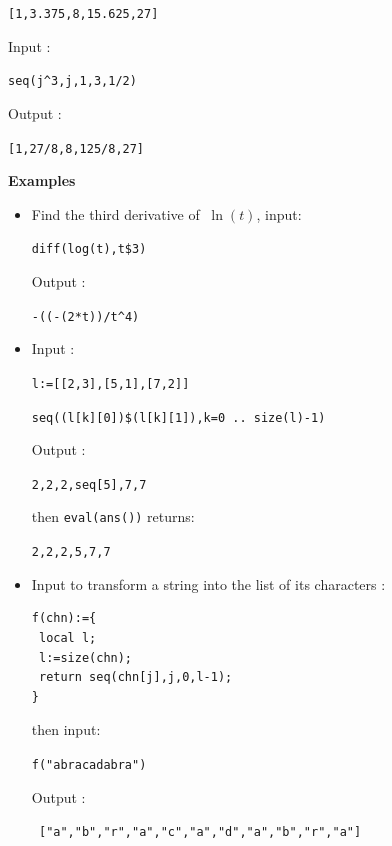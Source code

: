 \documentclass[a4paper,11pt]{book}
\begin{document}
\begin{center}{\tt [1,3.375,8,15.625,27]}\end{center}
Input :
\begin{center}{\tt seq(j\verb|^|3,j,1,3,1/2)}\end{center}
Output :
\begin{center}{\tt [1,27/8,8,125/8,27]}\end{center}
{\bf Examples}
\begin{itemize}
\item Find the third derivative of $\ \ln(t)$, input:
\begin{center}{\tt diff(log(t),t\$3)}\end{center}
Output :
\begin{center}{\tt -((-(2*t))/t\verb|^|4)}\end{center}
\item Input :
\begin{center}{\tt l:=[[2,3],[5,1],[7,2]]}\end{center}
\begin{center}{\tt seq((l[k][0])\$(l[k][1]),k=0 .. size(l)-1)}\end{center}
Output :
\begin{center}{\tt 2,2,2,seq[5],7,7}\end{center}
then {\tt eval(ans())} returns:
\begin{center}{\tt 2,2,2,5,7,7}\end{center}
\item Input to transform a string into the list of its characters :
\begin{verbatim}
f(chn):={
 local l;
 l:=size(chn);
 return seq(chn[j],j,0,l-1);
}
\end{verbatim}
then input:
\begin{center}{\tt f("abracadabra")}\end{center}
Output :
\begin{center}{\tt
    ["a","b","r","a","c","a","d","a","b","r","a"]}\end{center}
\end{itemize}
\end{document}
